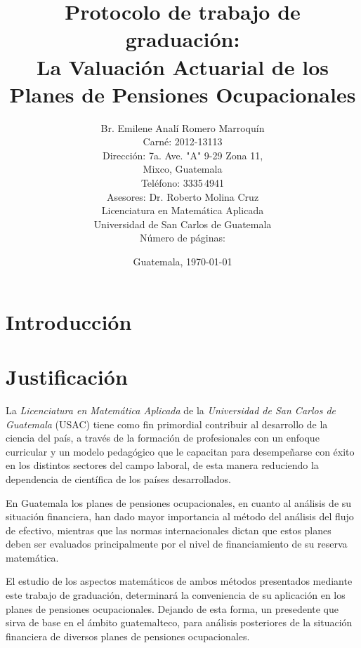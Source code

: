 \documentclass[12pt,letterpaper,titlepage]{article}
\title{Protocolo de trabajo de graduación:\\
La Valuación Actuarial de los Planes de Pensiones Ocupacionales}
\author{Br. Emilene Analí Romero Marroquín\\Carné: 2012-13113\\Dirección: 7a. Ave. "A" 9-29 Zona 11,\\Mixco, Guatemala\\Teléfono: 3335\,4941\\Asesores: Dr. Roberto Molina Cruz\\Licenciatura en Matemática Aplicada\\Universidad de San Carlos de Guatemala\\Número de páginas: \pageref{fin}}
\date{Guatemala, \today}
\begin{document}
\maketitle
\setcounter{page}{2}
\tableofcontents
\newpage
\nocite{*}
\section{Introducción}





\newpage

\section{Justificación}

La \textit{Licenciatura en Matemática Aplicada} de la \textit{Universidad de San Carlos de Guatemala} (USAC) tiene como fin primordial contribuir al desarrollo de la ciencia del país, a través de la formación de profesionales con un enfoque curricular y un modelo pedagógico que le capacitan para desempeñarse con éxito en los distintos sectores del campo laboral, de esta manera reduciendo la dependencia de científica de los países desarrollados.\bigskip

En Guatemala los planes de pensiones ocupacionales, en cuanto al análisis de su situación financiera, han dado mayor importancia al método del análisis del flujo de efectivo, mientras que las normas internacionales dictan que estos planes deben ser evaluados principalmente por el nivel de financiamiento de su reserva matemática.  \bigskip

El estudio de los aspectos matemáticos de ambos métodos presentados mediante este trabajo de graduación, determinará la conveniencia de su aplicación en los planes de pensiones ocupacionales. Dejando de esta forma, un presedente que sirva de base en el ámbito guatemalteco, para análisis posteriores de la situación financiera de diversos planes de pensiones ocupacionales.



\newpage
\end{document}
